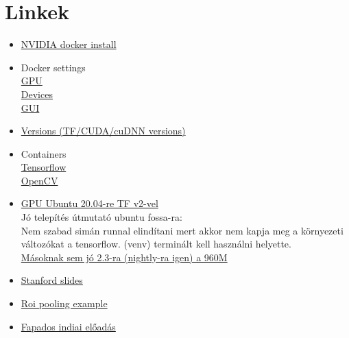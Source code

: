 \documentclass[12pt]{report}
\begin{document}
\chapter{Linkek}
\begin{itemize}
\item \href{https://docs.nvidia.com/datacenter/cloud-native/container-toolkit/install-guide.html#installing-on-ubuntu-and-debian}{NVIDIA docker install}


\item Docker settings
\\\href{https://docs.nvidia.com/datacenter/cloud-native/container-toolkit/user-guide.html#nvidia-require-cuda}{GPU}
\\\href{https://docs.docker.com/engine/reference/run/#runtime-privilege-and-linux-capabilities}{Devices}
\\\href{https://iamhow.com/How_To/Docker_How_To.html#1484268}{GUI}

\item \href{https://www.tensorflow.org/install/source#gpu}{Versions (TF/CUDA/cuDNN versions)}


\item Containers \\\href{https://hub.docker.com/r/tensorflow/tensorflow/tags?page=1&name=1.12}{Tensorflow}
\\\href{https://hub.docker.com/search?q=opencv&type=image}{OpenCV}



\item \href{https://towardsdatascience.com/installing-tensorflow-gpu-in-ubuntu-20-04-4ee3ca4cb75d}{GPU Ubuntu 20.04-re TF v2-vel} 
\\ Jó telepítés útmutató ubuntu fossa-ra:
\\ Nem szabad simán runnal elindítani mert akkor nem kapja meg a környezeti változókat a tensorflow. (venv) terminált kell használni helyette.
\\\href{https://github.com/tensorflow/tensorflow/issues/41990#issuecomment-683427929}{Másoknak sem jó 2.3-ra (nightly-ra igen) a 960M }


\item \href{http://cs231n.stanford.edu/slides/2017/cs231n_2017_lecture11.pdf#page=56}{Stanford slides} 

\item \href{https://medium.com/xplore-ai/implementing-attention-in-tensorflow-keras-using-roi-pooling-992508b6592b}{Roi pooling example} 

\item \href{https://www.youtube.com/watch?v=y6UmV8QwO9Q&list=PLkRkKTC6HZMy8smJGhhZ4HBIQgShLaTo8&ab_channel=ArdianUmam}{Fapados indiai előadás}


\end{itemize}
\end{document}
